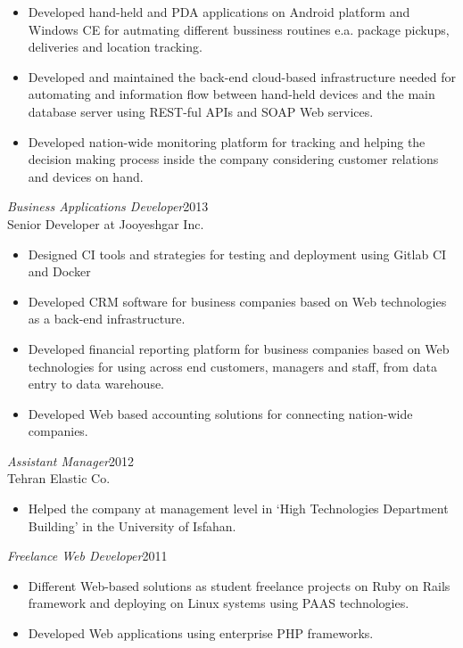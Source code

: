 \documentclass[margin, 10pt]{res} %
\begin{document}
\begin{resume}
\begin{itemize} \itemsep -2pt %
\item Developed hand-held and PDA applications on Android platform and Windows CE for autmating different bussiness
  routines e.a. package pickups, deliveries and location tracking.
\item Developed and maintained the back-end cloud-based infrastructure needed for automating and information flow between
  hand-held devices and the main database server using REST-ful APIs and SOAP Web services.
\item Developed nation-wide monitoring platform for tracking and helping the
  decision making process inside the company considering customer relations and devices on hand.
\end{itemize}
 
{\sl Business Applications Developer}\hfill 2013 \\
Senior Developer at Jooyeshgar Inc.
\begin{itemize}
\item Designed CI tools and strategies for testing and deployment using Gitlab
  CI and Docker
\item Developed CRM software for business companies based on Web technologies as a back-end infrastructure.
\item Developed financial reporting platform for business companies based on Web
  technologies for using across end customers, managers and staff, from data entry
  to data warehouse.
\item Developed Web based accounting solutions for connecting nation-wide companies.
\end{itemize} 

{\sl Assistant Manager}\hfill 2012 \\
Tehran Elastic Co.
\begin{itemize}
\item Helped the company at management level in `High Technologies Department
  Building' in the University of Isfahan.
\end{itemize} 

{\sl Freelance Web Developer}\hfill 2011 \\
\begin{itemize}
\item Different Web-based solutions as student freelance projects on Ruby on Rails
  framework and deploying on Linux systems using PAAS technologies.
\item Developed Web applications using enterprise PHP frameworks.
\end{itemize} 


\end{resume}
\end{document}
